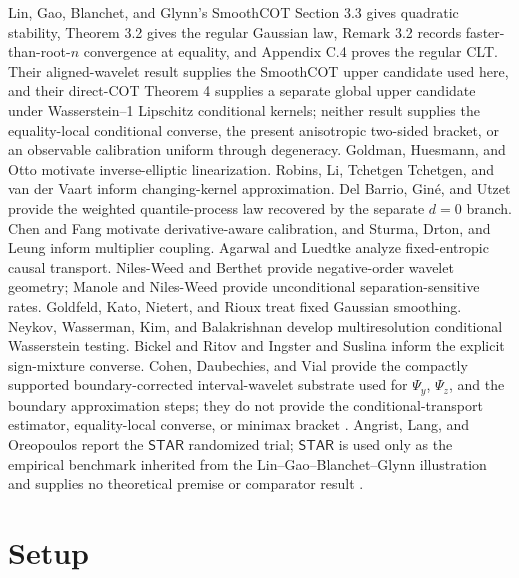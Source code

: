 \documentclass{article}
\begin{document}
Lin, Gao, Blanchet, and Glynn's SmoothCOT Section 3.3 gives quadratic stability, Theorem 3.2 gives the regular Gaussian law, Remark 3.2 records faster-than-root-\(n\) convergence at equality, and Appendix C.4 proves the regular CLT. Their aligned-wavelet result supplies the SmoothCOT upper candidate used here, and their direct-COT Theorem 4 supplies a separate global upper candidate under Wasserstein--1 Lipschitz conditional kernels; neither result supplies the equality-local conditional converse, the present anisotropic two-sided bracket, or an observable calibration uniform through degeneracy. Goldman, Huesmann, and Otto motivate inverse-elliptic linearization. Robins, Li, Tchetgen Tchetgen, and van der Vaart inform changing-kernel approximation. Del Barrio, Gin\'e, and Utzet provide the weighted quantile-process law recovered by the separate \(d=0\) branch. Chen and Fang motivate derivative-aware calibration, and Sturma, Drton, and Leung inform multiplier coupling. Agarwal and Luedtke analyze fixed-entropic causal transport. Niles-Weed and Berthet provide negative-order wavelet geometry; Manole and Niles-Weed provide unconditional separation-sensitive rates. Goldfeld, Kato, Nietert, and Rioux treat fixed Gaussian smoothing. Neykov, Wasserman, Kim, and Balakrishnan develop multiresolution conditional Wasserstein testing. Bickel and Ritov and Ingster and Suslina inform the explicit sign-mixture converse. Cohen, Daubechies, and Vial provide the compactly supported boundary-corrected interval-wavelet substrate used for \(\Psi_y\), \(\Psi_z\), and the boundary approximation steps; they do not provide the conditional-transport estimator, equality-local converse, or minimax bracket \cite{CohenDaubechiesVial1993}. Angrist, Lang, and Oreopoulos report the \(\mathsf{STAR}\) randomized trial; \(\mathsf{STAR}\) is used only as the empirical benchmark inherited from the Lin--Gao--Blanchet--Glynn illustration and supplies no theoretical premise or comparator result \cite{AngristLangOreopoulos2009STAR}.

\section{Setup}
\end{document}
